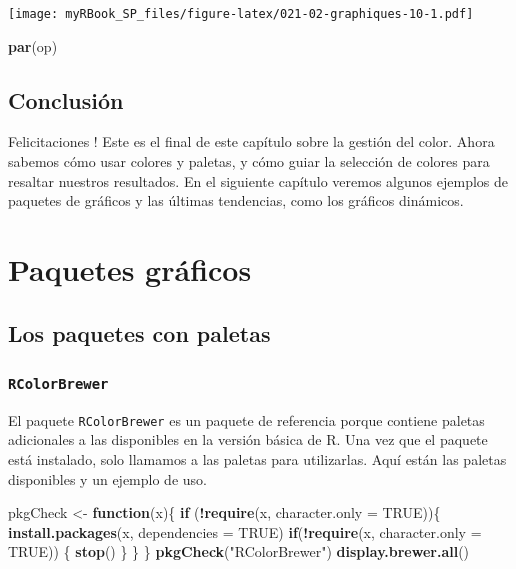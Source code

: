\documentclass[
]{book}
\newenvironment{Shaded}{\begin{snugshade}}{\end{snugshade}}
\newcommand{\ControlFlowTok}[1]{\textcolor[rgb]{0.13,0.29,0.53}{\textbf{#1}}}
\newcommand{\DataTypeTok}[1]{\textcolor[rgb]{0.13,0.29,0.53}{#1}}
\newcommand{\KeywordTok}[1]{\textcolor[rgb]{0.13,0.29,0.53}{\textbf{#1}}}
\newcommand{\NormalTok}[1]{#1}
\newcommand{\OperatorTok}[1]{\textcolor[rgb]{0.81,0.36,0.00}{\textbf{#1}}}
\newcommand{\OtherTok}[1]{\textcolor[rgb]{0.56,0.35,0.01}{#1}}
\newcommand{\StringTok}[1]{\textcolor[rgb]{0.31,0.60,0.02}{#1}}
\begin{document}
\texttt{[image: myRBook\_SP\_files/figure-latex/021-02-graphiques-10-1.pdf]}

\begin{Shaded}
\begin{Highlighting}[]
\KeywordTok{par}\NormalTok{(op)}
\end{Highlighting}
\end{Shaded}

\hypertarget{conclusiuxf3n-9}{%
\section{Conclusión}\label{conclusiuxf3n-9}}

Felicitaciones ! Este es el final de este capítulo sobre la gestión del color. Ahora sabemos cómo usar colores y paletas, y cómo guiar la selección de colores para resaltar nuestros resultados. En el siguiente capítulo veremos algunos ejemplos de paquetes de gráficos y las últimas tendencias, como los gráficos dinámicos.

\hypertarget{graph3}{%
\chapter{Paquetes gráficos}\label{graph3}}

\hypertarget{los-paquetes-con-paletas}{%
\section{Los paquetes con paletas}\label{los-paquetes-con-paletas}}

\hypertarget{rcolorbrewer}{%
\subsection{\texorpdfstring{\texttt{RColorBrewer}}{RColorBrewer}}\label{rcolorbrewer}}

El paquete \texttt{RColorBrewer} es un paquete de referencia porque contiene paletas adicionales a las disponibles en la versión básica de R. Una vez que el paquete está instalado, solo llamamos a las paletas para utilizarlas. Aquí están las paletas disponibles y un ejemplo de uso.

\begin{Shaded}
\begin{Highlighting}[]
\NormalTok{pkgCheck <-}\StringTok{ }\ControlFlowTok{function}\NormalTok{(x)\{ }
    \ControlFlowTok{if}\NormalTok{ (}\OperatorTok{!}\KeywordTok{require}\NormalTok{(x, }\DataTypeTok{character.only =} \OtherTok{TRUE}\NormalTok{))\{}
        \KeywordTok{install.packages}\NormalTok{(x, }\DataTypeTok{dependencies =} \OtherTok{TRUE}\NormalTok{)}
        \ControlFlowTok{if}\NormalTok{(}\OperatorTok{!}\KeywordTok{require}\NormalTok{(x, }\DataTypeTok{character.only =} \OtherTok{TRUE}\NormalTok{)) \{}
            \KeywordTok{stop}\NormalTok{()}
\NormalTok{        \}}
\NormalTok{    \}}
\NormalTok{\}}
\KeywordTok{pkgCheck}\NormalTok{(}\StringTok{"RColorBrewer"}\NormalTok{)}
\KeywordTok{display.brewer.all}\NormalTok{()}
\end{Highlighting}
\end{Shaded}
\end{document}
